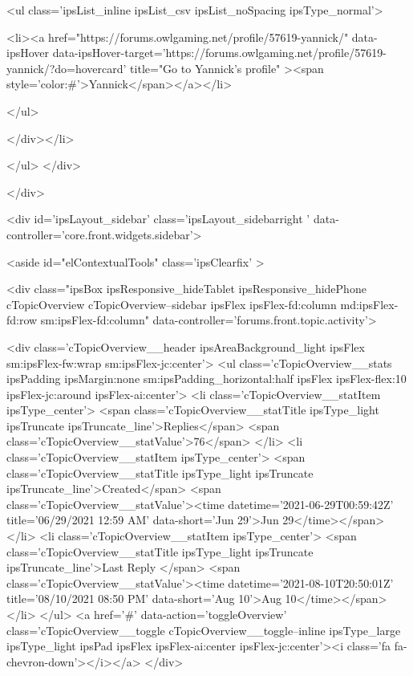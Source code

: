 		<ul class='ipsList_inline ipsList_csv ipsList_noSpacing ipsType_normal'>
			
				
					<li><a href="https://forums.owlgaming.net/profile/57619-yannick/" data-ipsHover data-ipsHover-target='https://forums.owlgaming.net/profile/57619-yannick/?do=hovercard' title="Go to Yannick's profile" ><span style='color:#'>Yannick</span></a></li>
				
			
		</ul>
		
	
</div></li>
				
			
		</ul>
	</div>

							</div>
							


	<div id='ipsLayout_sidebar' class='ipsLayout_sidebarright ' data-controller='core.front.widgets.sidebar'>
		
		
			<aside id="elContextualTools" class='ipsClearfix' >
				







<div class="ipsBox ipsResponsive_hideTablet ipsResponsive_hidePhone cTopicOverview cTopicOverview--sidebar ipsFlex ipsFlex-fd:column md:ipsFlex-fd:row sm:ipsFlex-fd:column" data-controller='forums.front.topic.activity'>

	<div class='cTopicOverview__header ipsAreaBackground_light ipsFlex sm:ipsFlex-fw:wrap sm:ipsFlex-jc:center'>
		<ul class='cTopicOverview__stats ipsPadding ipsMargin:none sm:ipsPadding_horizontal:half ipsFlex ipsFlex-flex:10 ipsFlex-jc:around ipsFlex-ai:center'>
			<li class='cTopicOverview__statItem ipsType_center'>
				<span class='cTopicOverview__statTitle ipsType_light ipsTruncate ipsTruncate_line'>Replies</span>
				<span class='cTopicOverview__statValue'>76</span>
			</li>
			<li class='cTopicOverview__statItem ipsType_center'>
				<span class='cTopicOverview__statTitle ipsType_light ipsTruncate ipsTruncate_line'>Created</span>
				<span class='cTopicOverview__statValue'><time datetime='2021-06-29T00:59:42Z' title='06/29/2021 12:59  AM' data-short='Jun 29'>Jun 29</time></span>
			</li>
			<li class='cTopicOverview__statItem ipsType_center'>
				<span class='cTopicOverview__statTitle ipsType_light ipsTruncate ipsTruncate_line'>Last Reply </span>
				<span class='cTopicOverview__statValue'><time datetime='2021-08-10T20:50:01Z' title='08/10/2021 08:50  PM' data-short='Aug 10'>Aug 10</time></span>
			</li>
		</ul>
		<a href='#' data-action='toggleOverview' class='cTopicOverview__toggle cTopicOverview__toggle--inline ipsType_large ipsType_light ipsPad ipsFlex ipsFlex-ai:center ipsFlex-jc:center'><i class='fa fa-chevron-down'></i></a>
	</div>
	
